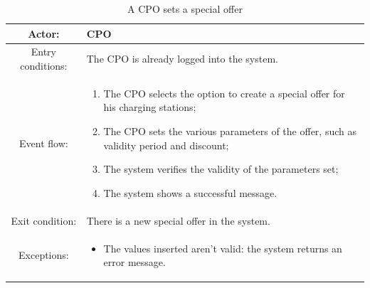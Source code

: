 \begin{table}[h]
    \begin{center}
        \begin{tabular}{|c||p{10cm}|}
            \hline
            Actor:            & \ac{CPO}                                        \\
            \hline
            Entry conditions: & The \ac{CPO} is already logged into the system. \\
            \hline
            Event flow:       &
            \begin{enumerate}
                \item The \ac{CPO} selects the option to create a special offer for his charging stations;
                \item The \ac{CPO} sets the various parameters of the offer, such as validity period and discount;
                \item The system verifies the validity of the parameters set;
                \item The system shows a successful message.
            \end{enumerate}
            \\
            \hline
            Exit condition:   & There is a new special offer in the system.     \\
            \hline
            Exceptions:       &
            \begin{itemize}
                \item The values inserted aren't valid: the system returns an error message.
            \end{itemize}
            \\
            \hline
        \end{tabular}
    \end{center}
    \caption{A \ac{CPO} sets a special offer}
\end{table}

